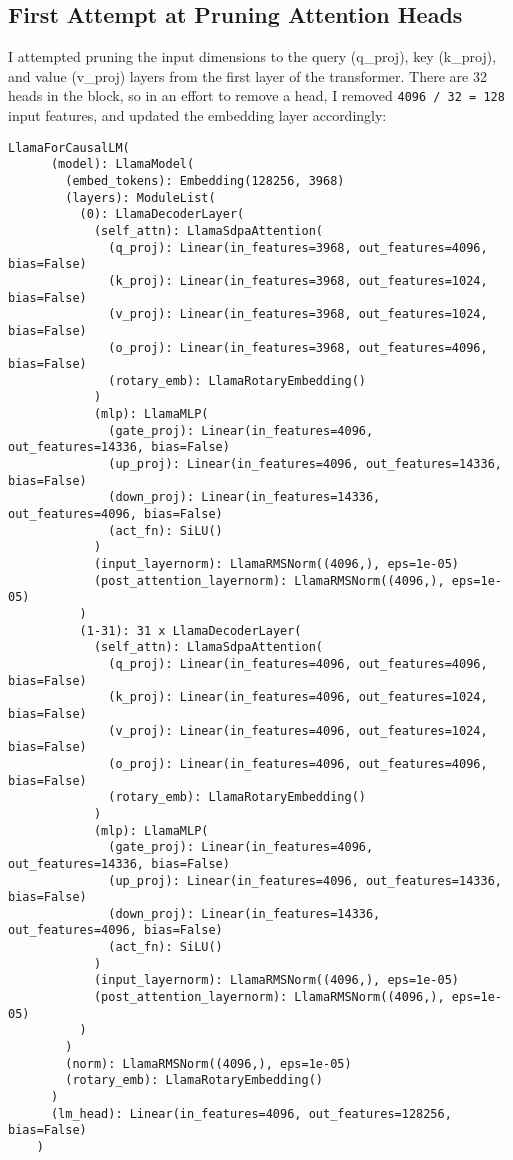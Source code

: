 \documentclass{article}
\begin{document}
    \subsection{First Attempt at Pruning Attention Heads}\label{subsec:prune_heads}

    I attempted pruning the input dimensions to the query (q\_proj), key (k\_proj), and value (v\_proj) layers from the first layer of the transformer.
    There are 32 heads in the block, so in an effort to remove a head, I removed \texttt{4096 / 32 = 128} input features, and updated the embedding layer accordingly:

    \begin{lstlisting}[label={lst:lsting2}]
            LlamaForCausalLM(
      (model): LlamaModel(
        (embed_tokens): Embedding(128256, 3968)
        (layers): ModuleList(
          (0): LlamaDecoderLayer(
            (self_attn): LlamaSdpaAttention(
              (q_proj): Linear(in_features=3968, out_features=4096, bias=False)
              (k_proj): Linear(in_features=3968, out_features=1024, bias=False)
              (v_proj): Linear(in_features=3968, out_features=1024, bias=False)
              (o_proj): Linear(in_features=3968, out_features=4096, bias=False)
              (rotary_emb): LlamaRotaryEmbedding()
            )
            (mlp): LlamaMLP(
              (gate_proj): Linear(in_features=4096, out_features=14336, bias=False)
              (up_proj): Linear(in_features=4096, out_features=14336, bias=False)
              (down_proj): Linear(in_features=14336, out_features=4096, bias=False)
              (act_fn): SiLU()
            )
            (input_layernorm): LlamaRMSNorm((4096,), eps=1e-05)
            (post_attention_layernorm): LlamaRMSNorm((4096,), eps=1e-05)
          )
          (1-31): 31 x LlamaDecoderLayer(
            (self_attn): LlamaSdpaAttention(
              (q_proj): Linear(in_features=4096, out_features=4096, bias=False)
              (k_proj): Linear(in_features=4096, out_features=1024, bias=False)
              (v_proj): Linear(in_features=4096, out_features=1024, bias=False)
              (o_proj): Linear(in_features=4096, out_features=4096, bias=False)
              (rotary_emb): LlamaRotaryEmbedding()
            )
            (mlp): LlamaMLP(
              (gate_proj): Linear(in_features=4096, out_features=14336, bias=False)
              (up_proj): Linear(in_features=4096, out_features=14336, bias=False)
              (down_proj): Linear(in_features=14336, out_features=4096, bias=False)
              (act_fn): SiLU()
            )
            (input_layernorm): LlamaRMSNorm((4096,), eps=1e-05)
            (post_attention_layernorm): LlamaRMSNorm((4096,), eps=1e-05)
          )
        )
        (norm): LlamaRMSNorm((4096,), eps=1e-05)
        (rotary_emb): LlamaRotaryEmbedding()
      )
      (lm_head): Linear(in_features=4096, out_features=128256, bias=False)
    )
    \end{lstlisting}
\end{document}
